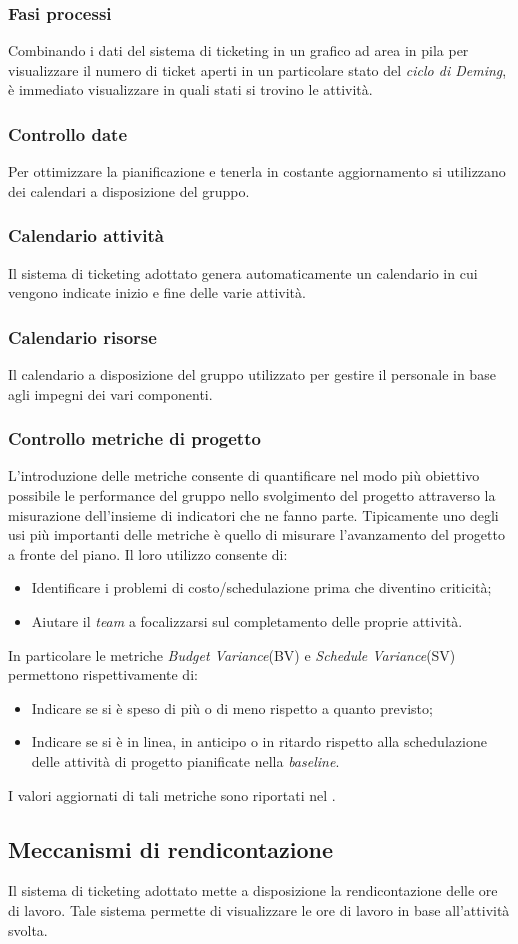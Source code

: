 		\subsubsection{Fasi processi}
		Combinando i dati del sistema di ticketing in un grafico ad area in pila per visualizzare il numero di ticket aperti in un particolare stato del \textit{ciclo di Deming}, è immediato visualizzare in quali stati si trovino le attività.
		\subsubsection{Controllo date} Per ottimizzare la pianificazione e tenerla in costante aggiornamento si utilizzano dei calendari a disposizione del gruppo.
		\subsubsection{Calendario attività}
		Il sistema di ticketing adottato genera automaticamente un calendario in cui vengono indicate inizio e fine delle varie attività.
		\subsubsection{Calendario risorse} Il calendario a disposizione del gruppo utilizzato per gestire il personale in base agli impegni dei vari componenti.
		\subsubsection{Controllo metriche di progetto} L'introduzione delle metriche consente di quantificare nel modo più obiettivo possibile le performance del gruppo nello svolgimento del progetto attraverso la misurazione dell'insieme di indicatori che ne fanno parte. Tipicamente uno degli usi più importanti delle metriche è quello di misurare l'avanzamento del progetto a fronte del piano. Il loro utilizzo consente di:
		\begin{itemize}
			\item Identificare i problemi di costo/schedulazione prima che diventino criticità;
			\item Aiutare il \textit{team} a focalizzarsi sul completamento delle proprie attività.
		\end{itemize}
		In particolare le metriche \textit{Budget Variance}(BV) e \textit{Schedule Variance}(SV) permettono rispettivamente di:
		\begin{itemize}
			\item Indicare se si è speso di più o di meno rispetto a quanto previsto;
			\item Indicare se si è in linea, in anticipo o in ritardo rispetto alla schedulazione delle	attività di progetto pianificate nella \textit{baseline}.
		\end{itemize}
		I valori aggiornati di tali metriche sono riportati nel \textit{\PdQ}.
	\subsection{Meccanismi di rendicontazione} Il sistema di ticketing adottato mette a disposizione la rendicontazione delle ore di lavoro. Tale sistema permette di visualizzare le ore di lavoro in base all'attività svolta.
